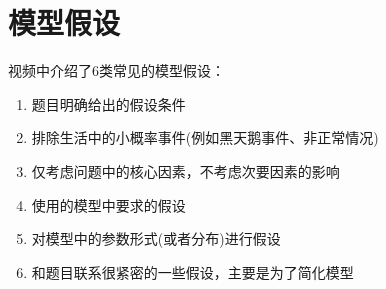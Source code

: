 \section{模型假设}
视频中介绍了6类常见的模型假设：
\begin{enumerate}
    \item 题目明确给出的假设条件
    \item 排除生活中的小概率事件(例如黑天鹅事件、非正常情况)
    \item 仅考虑问题中的核心因素，不考虑次要因素的影响
    \item 使用的模型中要求的假设
    \item 对模型中的参数形式(或者分布)进行假设
    \item 和题目联系很紧密的一些假设，主要是为了简化模型
\end{enumerate}
